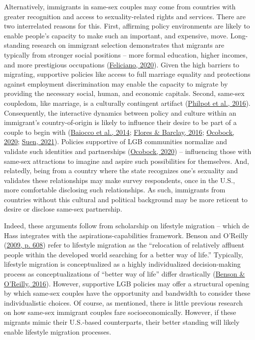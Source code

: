 \documentclass[
  11pt,
]{article}
\begin{document}
Alternatively, immigrants in same-sex couples may come from countries with greater recognition and access to sexuality-related rights and services. There are two interrelated reasons for this. First, affirming policy environments are likely to enable people's capacity to make such an important, and expensive, move. Long-standing research on immigrant selection demonstrates that migrants are typically from stronger social positions -- more formal education, higher incomes, and more prestigious occupations (\protect\hyperlink{ref-feliciano_2020}{Feliciano, 2020}). Given the high barriers to migrating, supportive policies like access to full marriage equality and protections against employment discrimination may enable the capacity to migrate by providing the necessary social, human, and economic capitals. Second, same-sex coupledom, like marriage, is a culturally contingent artifact (\protect\hyperlink{ref-philpot_2016_gay}{Philpot et al., 2016}). Consequently, the interactive dynamics between policy and culture within an immigrant's country-of-origin is likely to influence their desire to be part of a couple to begin with (\protect\hyperlink{ref-baiocco_2014_desire}{Baiocco et al., 2014}; \protect\hyperlink{ref-flores_2016_backlash}{Flores \& Barclay, 2016}; \protect\hyperlink{ref-ocobock_2020_leveraging}{Ocobock, 2020}; \protect\hyperlink{ref-suen_2021_sexual}{Suen, 2021}). Policies supportive of LGB communities normalize and validate such identities and partnerships (\protect\hyperlink{ref-ocobock_2020_leveraging}{Ocobock, 2020}) -- influencing those with same-sex attractions to imagine and aspire such possibilities for themselves. And, relatedly, being from a country where the state recognizes one's sexuality and validates these relationships may make survey respondents, once in the U.S., more comfortable disclosing such relationships. As such, immigrants from countries without this cultural and political background may be more reticent to desire or disclose same-sex partnership.

Indeed, these arguments follow from scholarship on lifestyle migration -- which de Hass integrates with the aspirations-capabilities framework. Benson and O'Reilly (\protect\hyperlink{ref-benson_2009}{2009, p. 608}) refer to lifestyle migration as the ``relocation of relatively affluent people within the developed world searching for a better way of life.'' Typically, lifestyle migration is conceptualized as a highly individualized decision-making process as conceptualizations of ``better way of life'' differ drastically (\protect\hyperlink{ref-benson_2016}{Benson \& O'Reilly, 2016}). However, supportive LGB policies may offer a structural opening by which same-sex couples have the opportunity and bandwidth to consider these individualistic choices. Of course, as mentioned, there is little previous research on how same-sex immigrant couples fare socioeconomically. However, if these migrants mimic their U.S.-based counterparts, their better standing will likely enable lifestyle migration processes.
\end{document}
